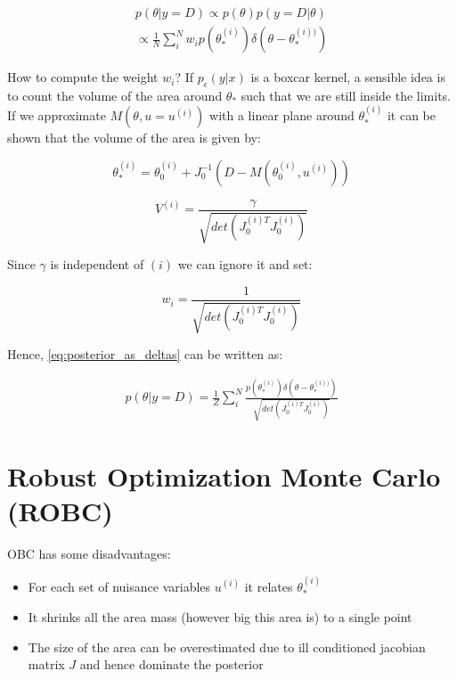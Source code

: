 \documentclass{article}
\begin{document}
\begin{gather} \label{eq:posterior_as_deltas}
  p(\theta|y=D) \propto p(\theta)p(y=D|\theta) \\
  \propto \frac{1}{N} \sum_i^N w_i p(\theta_*^{(i)})\delta(\theta - \theta_*^{(i))})
\end{gather}


How to compute the weight $w_i$? If $p_\epsilon(y|x)$ is a boxcar kernel, a sensible idea is to count the volume of the area around $\theta_*$ such that we are still inside the limits. If we approximate $M(\theta,u=u^{(i)})$ with a linear plane around $\theta_*^{(i)}$ it can be shown that the volume of the area is given by:


\begin{equation}
  \theta_*^{(i)} = \theta_0^{(i)} + J_0^{-1}(D - M(\theta^{(i)}_0, u^{(i)}))
\end{equation}

\begin{equation}
  V^{(i)} = \frac{\gamma}{\sqrt{det( J_0^{(i)T}J_0^{(i)})}}
\end{equation}

Since $\gamma$ is independent of $(i)$ we can ignore it and set:

\begin{equation}
  w_i = \frac{1}{\sqrt{det( J_0^{(i)T}J_0^{(i)})}}
\end{equation}

Hence, \ref{eq:posterior_as_deltas} can be written as:

\begin{gather} \label{eq:posterior_as_deltas}
  p(\theta|y=D) = \frac{1}{Z} \sum_i^N  \frac{p(\theta_*^{(i)})\delta(\theta - \theta_*^{(i))})}{\sqrt{det( J_0^{(i)T}J_0^{(i)})}}
\end{gather}


\section{Robust Optimization Monte Carlo (ROBC)}

OBC has some disadvantages:

\begin{itemize}
\item For each set of nuisance variables $u^{(i)}$ it relates  $\theta_*^{(i)}$
\item It shrinks all the area mass (however big this area is) to a single point
  \item The size of the area can be overestimated due to ill conditioned jacobian matrix $J$ and hence dominate the posterior
\end{itemize}
\end{document}
